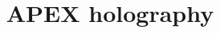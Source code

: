 \documentclass[11pt]{article}
\title{APEX holography}
\date{}
\begin{document}
\maketitle

\begin{abstract}

\end{abstract}


\end{document}
